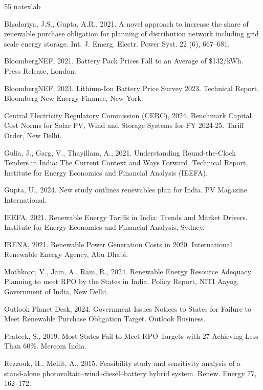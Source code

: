 \documentclass[11pt,a4paper]{article}
\begin{document}
\begin{thebibliography}{55}
\expandafter\ifx\csname natexlab\endcsname\relax\def\natexlab#1{#1}\fi

Bhadoriya, J.S., Gupta, A.R., 2021.
A novel approach to increase the share of renewable purchase obligation for planning of distribution network including grid scale energy storage.
Int. J. Emerg. Electr. Power Syst. 22 (6), 667--681.

BloombergNEF, 2021.
Battery Pack Prices Fall to an Average of \$132/kWh. Press Release, London.

BloombergNEF, 2023.
Lithium-Ion Battery Price Survey 2023. Technical Report, Bloomberg New Energy Finance, New York.

Central Electricity Regulatory Commission (CERC), 2024.
Benchmark Capital Cost Norms for Solar PV, Wind and Storage Systems for FY 2024-25. Tariff Order, New Delhi.

Gulia, J., Garg, V., Thayillam, A., 2021.
Understanding Round-the-Clock Tenders in India: The Current Context and Ways Forward. Technical Report, Institute for Energy Economics and Financial Analysis (IEEFA).

Gupta, U., 2024.
New study outlines renewables plan for India. PV Magazine International.

IEEFA, 2021.
Renewable Energy Tariffs in India: Trends and Market Drivers. Institute for Energy Economics and Financial Analysis, Sydney.

IRENA, 2021.
Renewable Power Generation Costs in 2020. International Renewable Energy Agency, Abu Dhabi.



Mothkoor, V., Jain, A., Ram, R., 2024.
Renewable Energy Resource Adequacy Planning to meet RPO by the States in India. Policy Report, NITI Aayog, Government of India, New Delhi.

Outlook Planet Desk, 2024.
Government Issues Notices to States for Failure to Meet Renewable Purchase Obligation Target. Outlook Business.

Prateek, S., 2019.
Most States Fail to Meet RPO Targets with 27 Achieving Less Than 60\%. Mercom India.

Rezzouk, H., Mellit, A., 2015.
Feasibility study and sensitivity analysis of a stand-alone photovoltaic--wind--diesel--battery hybrid system.
Renew. Energy 77, 162--172.


\end{thebibliography}
\end{document}
